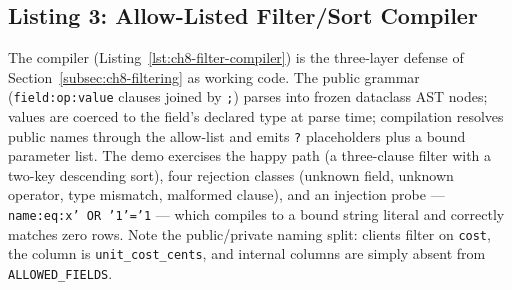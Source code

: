 \subsection{Listing 3: Allow-Listed Filter/Sort Compiler}
\label{subsec:ch8-code-compiler}

The compiler (Listing~\ref{lst:ch8-filter-compiler}) is the three-layer
defense of Section~\ref{subsec:ch8-filtering} as working code. The public
grammar (\texttt{field:op:value} clauses joined by \texttt{;}) parses into
frozen dataclass AST nodes; values are coerced to the field's declared type
at parse time; compilation resolves public names through the allow-list and
emits \texttt{?} placeholders plus a bound parameter list. The demo exercises
the happy path (a three-clause filter with a two-key descending sort), four
rejection classes (unknown field, unknown operator, type mismatch, malformed
clause), and an injection probe --- \texttt{name:eq:x' OR '1'='1} --- which
compiles to a bound string literal and correctly matches zero rows. Note the
public/private naming split: clients filter on \texttt{cost}, the column is
\texttt{unit\_cost\_cents}, and internal columns are simply absent from
\texttt{ALLOWED\_FIELDS}.

